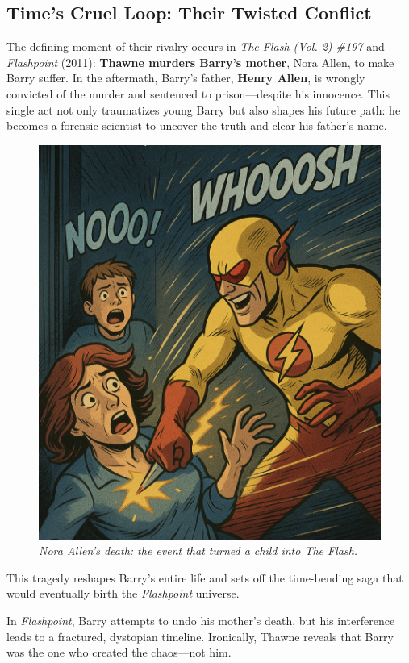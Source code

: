 \documentclass[a4paper,10pt,twocolumn]{memoir}
\begin{document}
\subsection*{Time’s Cruel Loop: Their Twisted Conflict}
The defining moment of their rivalry occurs in \textit{The Flash (Vol. 2) \#197} and \textit{Flashpoint} (2011): \textbf{Thawne murders Barry’s mother}, Nora Allen, to make Barry suffer. In the aftermath, Barry’s father, \textbf{Henry Allen}, is wrongly convicted of the murder and sentenced to prison—despite his innocence. This single act not only traumatizes young Barry but also shapes his future path: he becomes a forensic scientist to uncover the truth and clear his father's name.

\begin{figure}[h!]
  \centering
  \includegraphics[width=0.9\linewidth]{flashmomdead.png}
  \caption*{\textit{Nora Allen’s death: the event that turned a child into The Flash.}}
\end{figure}

This tragedy reshapes Barry’s entire life and sets off the time-bending saga that would eventually birth the \textit{Flashpoint} universe.

In \textit{Flashpoint}, Barry attempts to undo his mother's death, but his interference leads to a fractured, dystopian timeline. Ironically, Thawne reveals that Barry was the one who created the chaos---not him.
\end{document}
